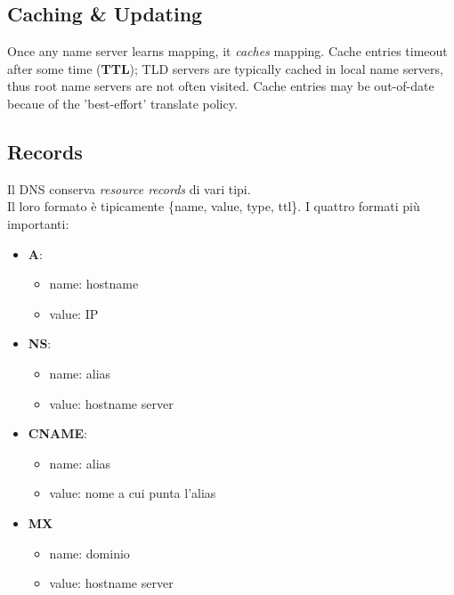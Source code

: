 \subsection{Caching \& Updating}
Once any name server learns mapping, it \textit{caches} mapping.
Cache entries timeout after some time (\textbf{TTL});
TLD servers are typically cached in local name servers, thus root name servers are not often visited.
Cache entries may be out-of-date becaue of the 'best-effort' translate policy.

\subsection{Records}
Il DNS conserva \textit{resource records} di vari tipi. \\
Il loro formato è tipicamente \{name, value, type, ttl\}.
I quattro formati più importanti:
\begin{itemize}
	\item \textbf{A}: 
	\begin{itemize}
		\item name: hostname
		\item value: IP
	\end{itemize}
	\item \textbf{NS}: 
	\begin{itemize}
		\item name: alias
		\item value: hostname server
	\end{itemize}
	\item \textbf{CNAME}:
	\begin{itemize}
		\item name: alias
		\item value: nome a cui punta l'alias
	\end{itemize}
	\item \textbf{MX}
	\begin{itemize}
		\item name: dominio
		\item value: hostname server
	\end{itemize}
\end{itemize}